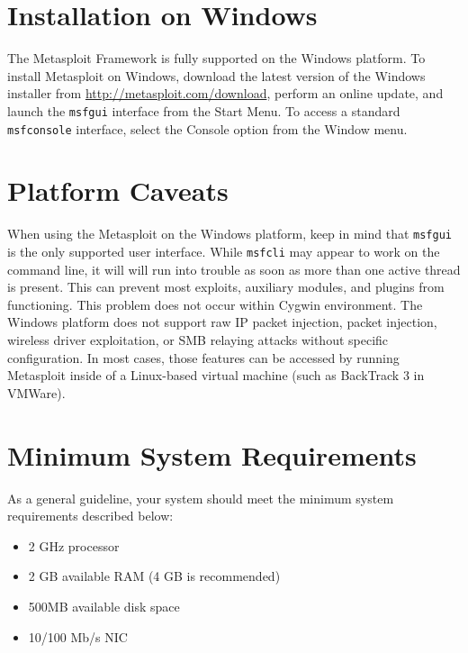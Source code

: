 \documentclass{report}
\begin{document}
    \section{Installation on Windows}
    \label{INSTALL-WIN32}

\par
The Metasploit Framework is fully supported on the Windows platform. To install
Metasploit on Windows, download the latest version of the Windows installer from
\url{http://metasploit.com/download}, perform an online update, and launch the
\texttt{msfgui} interface from the Start Menu. To access a standard
\texttt{msfconsole} interface, select the Console option from the Window menu.

    \section{Platform Caveats}
    \label{INSTALL-CAVEAT}

\par
When using the Metasploit on the Windows platform, keep in mind that
\texttt{msfgui} is the only supported user interface. While \texttt{msfcli} may
appear to work on the command line, it will will run into trouble as soon as
more than one active thread is present. This can prevent most exploits,
auxiliary modules, and plugins from functioning. This problem does not occur
within Cygwin environment. The Windows platform does not support raw IP packet
injection, packet injection, wireless driver exploitation, or SMB relaying
attacks without specific configuration. In most cases, those features can be
accessed by running Metasploit inside of a Linux-based virtual machine (such as
BackTrack 3 in VMWare).

    \section{Minimum System Requirements}
    \label{INSTALL-REQUIRE}

\par
As a general guideline, your system should meet the minimum system requirements
described below:

\begin{itemize}
\item 2 GHz processor
\item 2 GB available RAM (4 GB is recommended)
\item 500MB available disk space
\item 10/100 Mb/s NIC
\end{itemize}
\end{document}
